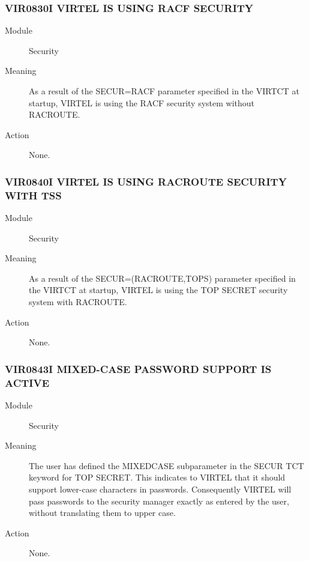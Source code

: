 \documentclass[letterpaper,10pt,english]{sphinxmanual}
\begin{document}
\subsubsection{VIR0830I VIRTEL IS USING RACF SECURITY}
\label{\detokenize{messages:vir0830i-virtel-is-using-racf-security}}\begin{description}
\item[{Module}] \leavevmode
Security

\item[{Meaning}] \leavevmode
As a result of the SECUR=RACF parameter specified in the VIRTCT at startup, VIRTEL is using the RACF security system without RACROUTE.

\item[{Action}] \leavevmode
None.

\end{description}


\subsubsection{VIR0840I VIRTEL IS USING RACROUTE SECURITY WITH TSS}
\label{\detokenize{messages:vir0840i-virtel-is-using-racroute-security-with-tss}}\begin{description}
\item[{Module}] \leavevmode
Security

\item[{Meaning}] \leavevmode
As a result of the SECUR=(RACROUTE,TOPS) parameter specified in the VIRTCT at startup, VIRTEL is using the TOP SECRET security system with RACROUTE.

\item[{Action}] \leavevmode
None.

\end{description}


\subsubsection{VIR0843I MIXED-CASE PASSWORD SUPPORT IS ACTIVE}
\label{\detokenize{messages:vir0843i-mixed-case-password-support-is-active}}\begin{description}
\item[{Module}] \leavevmode
Security

\item[{Meaning}] \leavevmode
The user has defined the MIXEDCASE subparameter in the SECUR TCT keyword for TOP SECRET. This indicates to VIRTEL that it should support lower-case characters in passwords. Consequently VIRTEL will pass passwords to the security manager exactly as entered by the user, without translating them to upper case.

\item[{Action}] \leavevmode
None.

\end{description}
\end{document}
